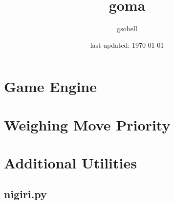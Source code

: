 \documentclass[11pt]{article}
\title{\textbf{goma}}
\author{gsobell}
\date{last updated: \today}
\begin{document}
\maketitle
{}
\subsection{}

\section{Game Engine}

\section{Weighing Move Priority}

\section{Additional Utilities}
\subsection{nigiri.py}
\end{document}
